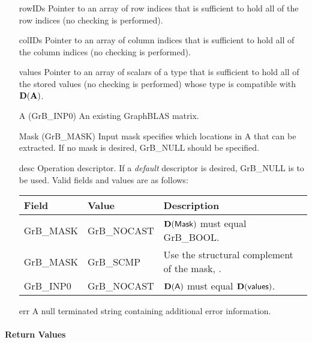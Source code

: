 \begin{itemize}[leftmargin=1.1in]
    \item[{\sf rowIDs}] Pointer to an array of row indices that is sufficient to
                        hold all of the row indices (no checking is performed).
    \item[{\sf colIDs}] Pointer to an array of column indices that is sufficient to
                        hold all of the column indices (no checking is performed). 
    \item[{\sf values}] Pointer to an array of scalars of a type that is sufficient to
                        hold all of the stored values (no checking is performed) whose
                        type is compatible with $\bold{D}({\bf A})$.
    \item[{\sf A}]      ({\sf GrB\_INP0}) An existing GraphBLAS matrix.
    \item[{\sf Mask}]   ({\sf GrB\_MASK}) Input mask specifies which locations in
                        {\sf A} that can be extracted.  If no mask is desired,
                        {\sf GrB\_NULL} should be specified.
    \item[{\sf desc}]   Operation descriptor. If a
    \emph{default} descriptor is desired, {\sf GrB\_NULL} is to be
    used.  Valid fields and values are as follows: \\
    \begin{tabular}{llp{3in}}
    Field  & Value & Description \\
    \hline
    {\sf GrB\_MASK} & {\sf GrB\_NOCAST} & $\bold{D}({\sf Mask})$ must equal {\sf GrB\_BOOL}. \\
    {\sf GrB\_MASK} & {\sf GrB\_SCMP}   & Use the structural complement of the mask, . \\
    {\sf GrB\_INP0} & {\sf GrB\_NOCAST} & $\bold{D}({\sf A})$ must equal $\bold{D}({\sf values})$. \\
    \end{tabular}
    \item[{\sf err}]     A null terminated string containing additional error information.
\end{itemize}

\paragraph{Return Values}

